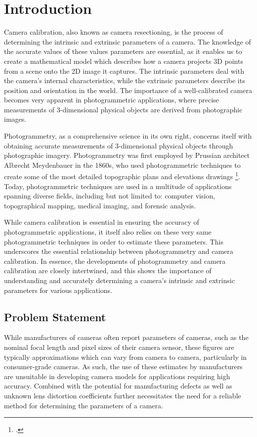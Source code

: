 \section{Introduction}

Camera calibration, also known as camera resectioning, is the process of determining the intrinsic and extrinsic parameters of a camera. The knowledge of the accurate values of these values parameters are essential, as it enables us to create a mathematical model which describes how a camera projects 3D points from a scene onto the 2D image it captures. The intrinsic parameters deal with the camera's internal characteristics, while the extrinsic parameters describe its position and orientation in the world. The importance of a well-calibrated camera becomes very apparent in photogrammetric applications, where precise measurements of 3-dimensional physical objects are derived from photographic images.

Photogrammetry, as a comprehensive science in its own right, concerns itself with obtaining accurate measurements of 3-dimensional physical objects through photographic imagery. Photogrammetry was first employed by Prussian architect Albrecht Meydenbauer in the 1860s, who used photogrammetric techniques to create some of the most detailed topographic plans and elevations drawings \footcite[][1]{albertzLookBack2007}. Today, photogrammetric techniques are used in a multitude of applications spanning diverse fields, including but not limited to: computer vision, topographical mapping, medical imaging, and forensic analysis. 

While camera calibration is essential in ensuring the accuracy of photogrammetric applications, it itself also relies on these very same photogrammetric techniques in order to estimate these parameters. This underscores the essential relationship between photogrammetry and camera calibration. In essence, the developments of photogrammetry and camera calibration are closely intertwined, and this shows the importance of understanding and accurately determining a camera's intrinsic and extrinsic parameters for various applications.

\subsection{Problem Statement}

While manufacturers of cameras often report parameters of cameras, such as the nominal focal length and pixel sizes of their camera sensor, these figures are typically approximations which can vary from camera to camera, particularly in consumer-grade cameras. As such, the use of these estimates by manufacturers are unsuitable in developing camera models for applications requiring high accuracy. Combined with the potential for manufacturing defects as well as unknown lens distortion coefficients further necessitates the need for a reliable method for determining the parameters of a camera. 

